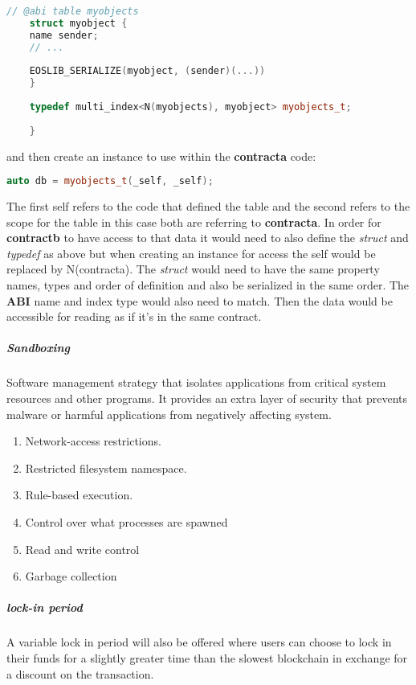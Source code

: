 \documentclass[]{article}
\begin{document}
	\begin{lstlisting}[language=C++, caption={C++ code using listings}]
	// @abi table myobjects
	struct myobject {
	name sender;
	// ... 
	
	EOSLIB_SERIALIZE(myobject, (sender)(...))
	}
	
	typedef multi_index<N(myobjects), myobject> myobjects_t;
	
	}
	\end{lstlisting}
	and then create an instance to use within the \textbf{contracta} code:\\
	\begin{lstlisting}[language=C++, caption={C++ code using listings}]
	auto db = myobjects_t(_self, _self);
	\end{lstlisting}
	
	The first self refers to the code that defined the table and the second refers
	to the scope for the table in this case both are referring to \textbf{contracta}.
	In order for \textbf{contractb} to have access to that data it would need to also define
	the \textit{struct} and \textit{typedef} as above but when creating an instance for access the
	self would be replaced by N(contracta).
	The \textit{struct} would need to have the same property names, types and order of
	definition and also be serialized in the same order. The \textbf{ABI} name and index
	type would also need to match. Then the data would be accessible for reading
	as if it's in the same contract. 
	
	
	\subparagraph{Sandboxing}
	Software management strategy that isolates applications from
	critical system resources and other programs. 
	It provides an extra layer of security that prevents malware 
	or harmful applications from negatively affecting system.
	\begin{enumerate}
	\item Network-access restrictions.
	\item Restricted filesystem namespace.
    \item Rule-based execution. 
	\item Control over what processes are spawned
	\item Read and write control
	\item Garbage collection 
	\end{enumerate}

	\subparagraph{lock-in period}
	A variable lock in period will also be offered where users can choose to lock in their funds for a slightly greater time than the slowest blockchain in exchange for a discount on the transaction.
		
\end{document}
